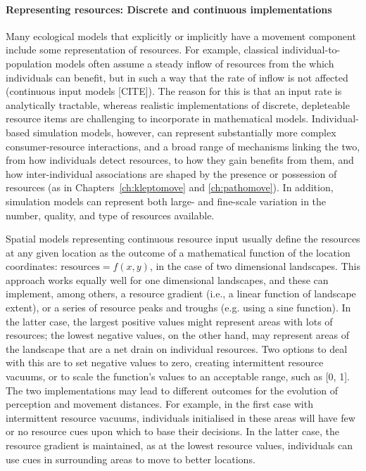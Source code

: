 \paragraph*{Representing resources: Discrete and continuous implementations}

Many ecological models that explicitly or implicitly have a movement component include some representation of resources.
For example, classical individual-to-population models often assume a steady inflow of resources from the which individuals can benefit, but in such a way that the rate of inflow is not affected (continuous input models [CITE]).
The reason for this is that an input rate is analytically tractable, whereas realistic implementations of discrete, depleteable resource items are challenging to incorporate in mathematical models.
Individual-based simulation models, however, can represent substantially more complex consumer-resource interactions, and a broad range of mechanisms linking the two, from how individuals detect resources, to how they gain benefits from them, and how inter-individual associations are shaped by the presence or possession of resources (as in Chapters~\ref{ch:kleptomove} and \ref{ch:pathomove}).
In addition, simulation models can represent both large- and fine-scale variation in the number, quality, and type of resources available.

Spatial models representing continuous resource input usually define the resources at any given location as the outcome of a mathematical function of the location coordinates: $\text{resources} = f(x,y)$, in the case of two dimensional landscapes.
This approach works equally well for one dimensional landscapes, and these can implement, among others, a resource gradient (i.e., a linear function of landscape extent), or a series of resource peaks and troughs (e.g. using a sine function).
In the latter case, the largest positive values might represent areas with lots of resources; the lowest negative values, on the other hand, may represent areas of the landscape that are a net drain on individual resources.
Two options to deal with this are to set negative values to zero, creating intermittent resource vacuums, or to scale the function's values to an acceptable range, such as [0, 1].
The two implementations may lead to different outcomes for the evolution of perception and movement distances.
For example, in the first case with intermittent resource vacuums, individuals initialised in these areas will have few or no resource cues upon which to base their decisions.
In the latter case, the resource gradient is maintained, as at the lowest resource values, individuals can use cues in surrounding areas to move to better locations.

